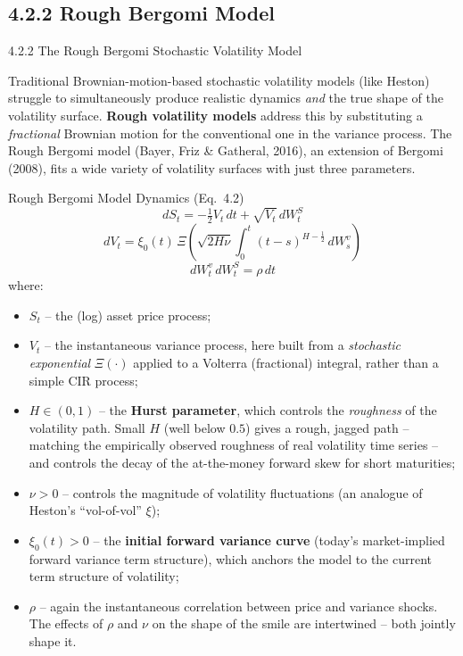 \documentclass[aspectratio=169,10pt]{beamer}
\begin{document}
\subsection{4.2.2 Rough Bergomi Model}

\begin{frame}[allowframebreaks]{4.2.2 The Rough Bergomi Stochastic Volatility Model}

Traditional Brownian-motion-based stochastic volatility models (like
Heston) struggle to simultaneously produce realistic dynamics \emph{and}
the true shape of the volatility surface. \textbf{Rough volatility models}
address this by substituting a \emph{fractional} Brownian motion for the
conventional one in the variance process. The Rough Bergomi model (Bayer,
Friz \& Gatheral, 2016), an extension of Bergomi (2008), fits a wide
variety of volatility surfaces with just three parameters.

\begin{block}{Rough Bergomi Model Dynamics (Eq.\ 4.2)}
\[
  dS_t = -\tfrac{1}{2}V_t\,dt + \sqrt{V_t}\,dW_t^S
\]
\[
  dV_t = \xi_0(t)\,\Xi\!\left(\sqrt{2H\nu}\int_0^t (t-s)^{H-\frac12}\,dW_s^v\right)
\]
\[
  dW_t^v\,dW_t^S = \rho\,dt
\]
where:
\begin{itemize}
  \item $S_t$ -- the (log) asset price process;
  \item $V_t$ -- the instantaneous variance process, here built from a
        \emph{stochastic exponential} $\Xi(\cdot)$ applied to a
        Volterra (fractional) integral, rather than a simple CIR process;
  \item $H \in (0,1)$ -- the \textbf{Hurst parameter}, which controls the
        \emph{roughness} of the volatility path. Small $H$ (well below
        $0.5$) gives a rough, jagged path -- matching the empirically
        observed roughness of real volatility time series -- and controls
        the decay of the at-the-money forward skew for short maturities;
  \item $\nu > 0$ -- controls the magnitude of volatility fluctuations
        (an analogue of Heston's ``vol-of-vol'' $\xi$);
  \item $\xi_0(t) > 0$ -- the \textbf{initial forward variance curve}
        (today's market-implied forward variance term structure), which
        anchors the model to the current term structure of volatility;
  \item $\rho$ -- again the instantaneous correlation between price and
        variance shocks. The effects of $\rho$ and $\nu$ on the shape of
        the smile are intertwined -- both jointly shape it.
\end{itemize}
\end{block}


\end{frame}
\end{document}
